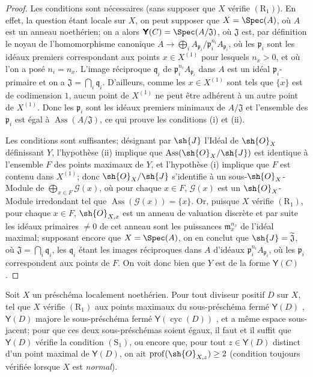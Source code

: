 \begin{proof}
Les conditions sont nécessaires (sans supposer que $X$ vérifie $(\mathrm{R}_1)$).
En effet, la question étant locale sur $X$, on peut supposer que $X=\Spec(A)$, où $A$ est un anneau noethérien;
on a alors $\boldsymbol{\mathsf{Y}}(C)=\Spec(A/\mathfrak{J})$, où $\mathfrak{J}$ est, par définition  le noyau de l'homomorphisme canonique $A\to\bigoplus_i A_{\mathfrak{p}_i}/\mathfrak{p}_i^{n_i}A_{\mathfrak{p}_i}$, où les $\mathfrak{p}_i$ sont les idéaux premiers correspondant aux points $x\in X^{(1)}$ pour lesquels $n_x>0$, et où l'on a posé $n_i=n_x$.
L'image réciproque $\mathfrak{q}_i$ de $\mathfrak{p}_i^{n_i}A_{\mathfrak{p}_i}$ dans $A$ est un idéal $\mathfrak{p}_i$-primaire et on a $\mathfrak{J}=\bigcap_i\mathfrak{q}_i$.
D'ailleurs, comme les $x\in X^{(1)}$ sont tels que $\overline{\{x\}}$ est de codimension $1$, aucun point de $X^{(1)}$ ne peut être adhérent à un autre point de $X^{(1)}$.
Donc les $\mathfrak{p}_i$ sont les idéaux premiers minimaux de $A/\mathfrak{J}$ et l'ensemble des $\mathfrak{p}_i$ est égal à $\operatorname{Ass}(A/\mathfrak{J})$, ce qui prouve les conditions (i) et (ii).

Les conditions sont suffisantes;
désignant par $\sh{J}$ l'Idéal de $\sh{O}_X$ définissant $Y$, l'hypothèse (ii) implique que $\operatorname{Ass}(\sh{O}_X/\sh{J})$ est identique à l'ensemble $F$ des points maximaux de $Y$, et l'hypothèse (i) implique que $F$ est contenu dans $X^{(1)}$;
donc  $\sh{O}_X/\sh{J}$ s'identifie à un sous-$\sh{O}_X$-Module de $\bigoplus_{x\in F}\mathscr{G}(x)$, où pour chaque $x\in F$, $\mathscr{G}(x)$ est un $\sh{O}_X$-Module irredondant tel que $\operatorname{Ass}(\mathscr{G}(x))=\{x\}$.
Or, puisque $X$ vérifie $(\mathrm{R}_1)$, pour chaque $x\in F$, $\sh{O}_{X,x}$ est un anneau de valuation discrète et par suite les idéaux primaires $\neq0$ de cet anneau sont les puissances $\mathfrak{m}_x^{n_x}$ de l'idéal maximal;
supposant encore que $X=\Spec(A)$, on en conclut que $\sh{J}=\widetilde{\mathfrak{J}}$, où $\mathfrak{J}=\bigcap_i\mathfrak{q}_i$, les $\mathfrak{q}_i$ étant les images réciproques dans $A$ d'idéaux $\mathfrak{p}_i^{n_i}A_{\mathfrak{p}_i}$, où les $\mathfrak{p}_i$ correspondent aux points de $F$.
On voit donc bien que $Y$ est de la forme $\boldsymbol{\mathsf{Y}}(C)$.
\end{proof}

\begin{corollary}[21.7.3]
\label{IV.21.7.3}
Soit $X$ un préschéma localement noethérien.
Pour tout diviseur positif $D$ sur $X$, tel que $X$ vérifie $(\mathrm{R}_1)$ aux points maximaux du sous-préschéma fermé $\boldsymbol{\mathsf{Y}}(D)$ , $\boldsymbol{\mathsf{Y}}(D)$ majore le sous-préschéma fermé $\boldsymbol{\mathsf{Y}}(\operatorname{cyc}(D))$ , et a même espace sous-jacent;
pour que ces deux sous-préschémas soient égaux, il faut et il suffit que $\boldsymbol{\mathsf{Y}}(D)$ vérifie la condition $(\mathrm{S}_1)$, ou encore que, pour tout $z\in\boldsymbol{\mathsf{Y}}(D)$ distinct d'un point maximal de $\boldsymbol{\mathsf{Y}}(D)$, on ait $\operatorname{prof}(\sh{O}_{X,z})\geq2$ \textup{(condition toujours vérifiée lorsque $X$ est \emph{normal})}.
\end{corollary}

